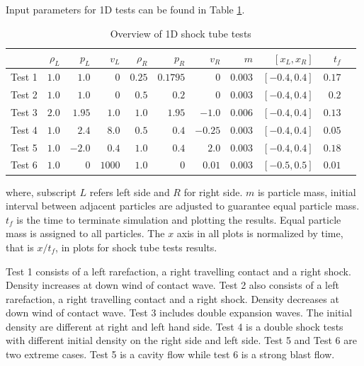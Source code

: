 \documentclass[review]{elsarticle}
\begin{document}
Input parameters for 1D tests can be found in Table \ref{tab:1D-shock-input_parameters}. 
\begin{table}[htp]
\centering
      \caption{Overview of 1D shock tube tests}		
	  \begin{tabular}{lrrrrrrrrrr}
	    \hline
	          & $\rho_L$ & $p_L$ &$v_L$ & $\rho_R$ & $p_R$ &$v_R$ & $m$ & $[x_L, x_R]$ & $t_f$\\
	    \hline
	    Test 1 & $1.0$ & $1.0$ &$0$ & $0.25$ & $0.1795$ &$0$ & $0.003$  & $[-0.4, 0.4]$ & $0.17$\\
	    	Test 2 & $1.0$ & $1.0$ &$0$ & $0.5$ & $0.2$ &$0$ & $0.003$  & $[-0.4, 0.4]$ & $0.2$\\
	    	Test 3 & $2.0$ & $1.95$ &$1.0$ & $1.0$ & $1.95$ &$-1.0$  & $0.006$  & $[-0.4, 0.4]$ & $0.13$\\
	    Test 4 & $1.0$ & $2.4$ &$8.0$ & $0.5$ & $0.4$ &$-0.25$ & $0.003$  & $[-0.4, 0.4]$ & $0.05$\\
	    	Test 5 & $1.0$ & $-2.0$ &$0.4$ & $1.0$ & $0.4$ &$2.0$ & $0.003$  & $[-0.4, 0.4]$ & $0.18$\\
	    	Test 6 & $1.0$ & $0$ &$1000$ & $1.0$ & $0$ &$0.01$ & $0.003$  & $[-0.5, 0.5]$  & $0.01$\\
	    \hline
	  \end{tabular}
	  \label{tab:1D-shock-input_parameters}
\end{table}
where, subscript $L$ refers left side and $R$ for right side. $m$ is particle mass, initial interval between adjacent particles are adjusted to guarantee equal particle mass. $t_f$ is the time to terminate simulation and plotting the results. Equal particle mass is assigned to all particles. The $x$ axis in all plots is normalized by time, that is $x/t_f$, in plots for shock tube tests results.

Test 1 consists of a left rarefaction, a right travelling contact and a right shock. Density increases at down wind of contact wave.
Test 2 also consists of a left rarefaction, a right travelling contact and a right shock. Density decreases at down wind of contact wave.
Test 3 includes double expansion waves. The initial density are different at right and left hand side.
Test 4 is a double shock tests with different initial density on the right side and left side.
Test 5 and Test 6 are two extreme cases. Test 5 is a cavity flow while test 6 is a strong blast flow.
\end{document}
